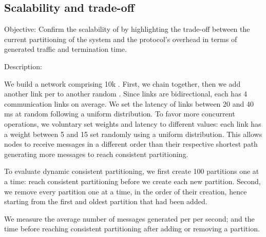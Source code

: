 \subsection{Scalability and trade-off}
\begin{asparadesc}
\item [Objective:] Confirm the scalability of \NAME by highlighting the
  trade-off between the current partitioning of the system and the
  protocol's overhead in terms of generated traffic and termination
  time.
  
\item [Description:]
  
We build a network comprising 10k \processes. First, we chain
\processes together, then we add another link per
\process to another random \process. Since links are bidirectional,
each \process has 4 communication links on average. We set the latency
of links between 20 and 40 ms at random following a uniform
distribution.
%
To favor more concurrent operations, we voluntary set
weights and latency to different values: each link has a weight
between 5 and 15 set randomly using a uniform distribution. This
allows nodes to receive messages in a different order than their
respective shortest path generating more messages to reach consistent
partitioning.


\noindent To evaluate dynamic consistent partitioning, we first
create 100 partitions one at a time: \processes reach consistent
partitioning before we create each new partition. Second, we remove
every partition one at a time, in the order of their creation, hence
starting from the first and oldest partition that had been added.

\noindent We measure the average number of messages generated per
\process per second; and the time before reaching consistent
partitioning after adding or removing a partition.



\end{asparadesc}
